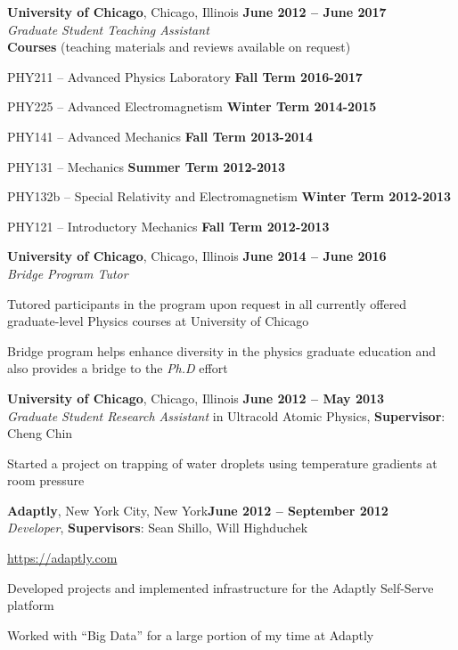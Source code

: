 \documentclass[margin,line]{resume}
\begin{document}
\begin{resume}
\textbf{University of Chicago}, Chicago, Illinois \hfill \textbf{June 2012 -- June 2017}\\
\textsl{Graduate Student Teaching Assistant}\\
\textbf{Courses} (teaching materials and reviews available on request)
\begin{list2}
  \item PHY211 -- Advanced Physics Laboratory \hfill \textbf{Fall Term 2016-2017}
  \item PHY225 -- Advanced Electromagnetism \hfill \textbf{Winter Term 2014-2015}
  \item PHY141 -- Advanced Mechanics \hfill \textbf{Fall Term 2013-2014}
  \item PHY131 -- Mechanics \hfill \textbf{Summer Term 2012-2013}
  \item PHY132b -- Special Relativity and Electromagnetism \hfill \textbf{Winter Term 2012-2013}
  \item PHY121 -- Introductory Mechanics \hfill \textbf{Fall Term 2012-2013}
\end{list2}

\textbf{University of Chicago}, Chicago, Illinois \hfill \textbf{June 2014 -- June 2016}\\
\textsl{Bridge Program Tutor}
\begin{list2}
  \item Tutored participants in the program upon request in all currently offered graduate-level Physics courses at University of Chicago
  \item Bridge program helps enhance diversity in the physics graduate education and also provides a bridge to the \textsl{Ph.D} effort
\end{list2}

\textbf{University of Chicago}, Chicago, Illinois  \hfill \textbf{June 2012 -- May 2013}\\
\textsl{Graduate Student Research Assistant} in Ultracold Atomic Physics, \textbf{Supervisor}: Cheng Chin
\begin{list2}
  \item Started a project on trapping of water droplets using temperature gradients at room pressure
\end{list2}

\textbf{Adaptly}, New York City, New York\hfill \textbf{June 2012 -- September 2012}\\
\textsl{Developer}, \textbf{Supervisors}: Sean Shillo, Will Highduchek
\begin{list2}
  \item \url{https://adaptly.com}
  \item Developed projects and implemented infrastructure for the Adaptly Self-Serve platform
  \item Worked with ``Big Data'' for a large portion of my time at Adaptly
\end{list2}


\end{resume}
\end{document}
